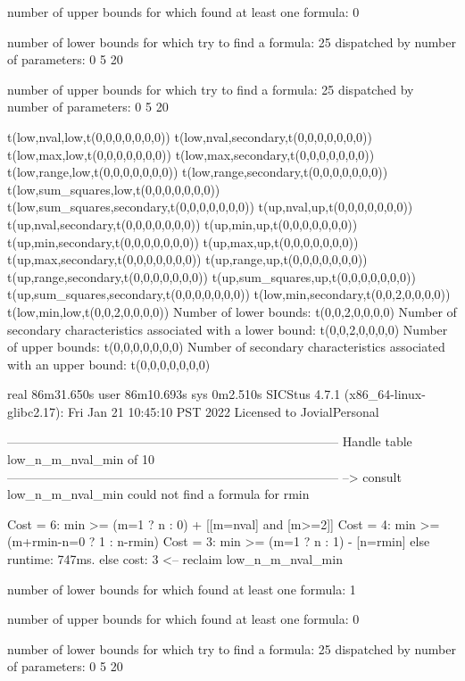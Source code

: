 number of upper bounds for which found at least one formula: 0

number of lower bounds for which try to find a formula: 25
dispatched by number of parameters: 0  5  20

number of upper bounds for which try to find a formula: 25
dispatched by number of parameters: 0  5  20

t(low,nval,low,t(0,0,0,0,0,0,0))
t(low,nval,secondary,t(0,0,0,0,0,0,0))
t(low,max,low,t(0,0,0,0,0,0,0))
t(low,max,secondary,t(0,0,0,0,0,0,0))
t(low,range,low,t(0,0,0,0,0,0,0))
t(low,range,secondary,t(0,0,0,0,0,0,0))
t(low,sum_squares,low,t(0,0,0,0,0,0,0))
t(low,sum_squares,secondary,t(0,0,0,0,0,0,0))
t(up,nval,up,t(0,0,0,0,0,0,0))
t(up,nval,secondary,t(0,0,0,0,0,0,0))
t(up,min,up,t(0,0,0,0,0,0,0))
t(up,min,secondary,t(0,0,0,0,0,0,0))
t(up,max,up,t(0,0,0,0,0,0,0))
t(up,max,secondary,t(0,0,0,0,0,0,0))
t(up,range,up,t(0,0,0,0,0,0,0))
t(up,range,secondary,t(0,0,0,0,0,0,0))
t(up,sum_squares,up,t(0,0,0,0,0,0,0))
t(up,sum_squares,secondary,t(0,0,0,0,0,0,0))
t(low,min,secondary,t(0,0,2,0,0,0,0))
t(low,min,low,t(0,0,2,0,0,0,0))
Number of lower bounds:                                             t(0,0,2,0,0,0,0)
Number of secondary characteristics associated with a lower bound:  t(0,0,2,0,0,0,0)
Number of upper bounds:                                             t(0,0,0,0,0,0,0)
Number of secondary characteristics associated with an upper bound: t(0,0,0,0,0,0,0)

real	86m31.650s
user	86m10.693s
sys	0m2.510s
SICStus 4.7.1 (x86_64-linux-glibc2.17): Fri Jan 21 10:45:10 PST 2022
Licensed to JovialPersonal


--------------------------------------------------------------------------------
Handle table low_n_m_nval_min of 10
--------------------------------------------------------------------------------
--> consult low_n_m_nval_min
could not find a formula for rmin

Cost =  6:  min >= (m=1 ? n : 0) + [[m=nval] and [m>=2]] %
Cost =  4:  min >= (m+rmin-n=0 ? 1 : n-rmin)
Cost =  3:  min >= (m=1 ? n : 1) - [n=rmin] %
else runtime: 747ms. else cost: 3
<-- reclaim low_n_m_nval_min

number of lower bounds for which found at least one formula: 1

number of upper bounds for which found at least one formula: 0

number of lower bounds for which try to find a formula: 25
dispatched by number of parameters: 0  5  20


